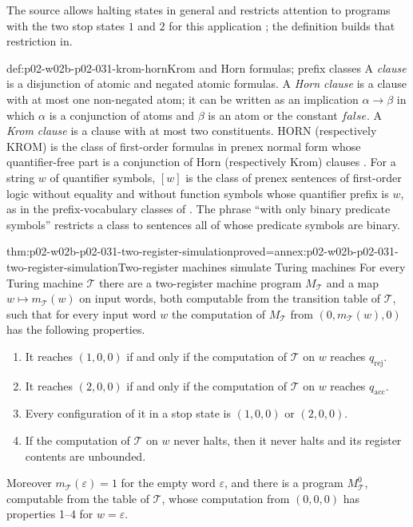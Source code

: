 The source allows halting states in general and restricts attention to
programs with the two stop states \(1\) and \(2\) for this application
\cite[Sect.~2.1.2, p.~34]{BorgerGradelGurevich1997}; the definition builds
that restriction in.

\begin{hbdefinition}{def:p02-w02b-p02-031-krom-horn}{Krom and Horn formulas; prefix classes}
A \emph{clause} is a disjunction of atomic and negated atomic formulas.  A
\emph{Horn clause} is a clause with at most one non-negated atom; it can be
written as an implication \(\alpha\to\beta\) in which \(\alpha\) is a
conjunction of atoms and \(\beta\) is an atom or the constant
\(\mathit{false}\).  A \emph{Krom clause} is a clause with at most two
constituents.  \(\mathrm{HORN}\) (respectively \(\mathrm{KROM}\)) is the
class of first-order formulas in prenex normal form whose quantifier-free part
is a conjunction of Horn (respectively Krom) clauses
\cite[Sect.~2.1.1, Def.~2.1.14, p.~27]{BorgerGradelGurevich1997}.  For a
string \(w\) of quantifier symbols, \([w]\) is the class of prenex sentences of
first-order logic without equality and without function symbols whose
quantifier prefix is \(w\), as in the prefix-vocabulary classes of
\cite[Sect.~1.3, Def.~1.3.1, p.~8]{BorgerGradelGurevich1997}.  The phrase
``with only binary predicate symbols'' restricts a class to sentences all of
whose predicate symbols are binary.
\end{hbdefinition}

\begin{hbtheorem}{thm:p02-w02b-p02-031-two-register-simulation}{proved=annex:p02-w02b-p02-031-two-register-simulation}{Two-register machines simulate Turing machines}
For every Turing machine \(\mathcal T\) there are a two-register machine
program \(M_{\mathcal T}\) and a map \(w\mapsto m_{\mathcal T}(w)\) on input
words, both computable from the transition table of \(\mathcal T\), such that
for every input word \(w\) the computation of \(M_{\mathcal T}\) from
\((0,m_{\mathcal T}(w),0)\) has the following properties.
\begin{enumerate}
\item It reaches \((1,0,0)\) if and only if the computation of \(\mathcal T\)
      on \(w\) reaches \(q_{\mathrm{rej}}\).
\item It reaches \((2,0,0)\) if and only if the computation of \(\mathcal T\)
      on \(w\) reaches \(q_{\mathrm{acc}}\).
\item Every configuration of it in a stop state is \((1,0,0)\) or \((2,0,0)\).
\item If the computation of \(\mathcal T\) on \(w\) never halts, then it never
      halts and its register contents are unbounded.
\end{enumerate}
Moreover \(m_{\mathcal T}(\varepsilon)=1\) for the empty word
\(\varepsilon\), and there is a program \(M^{0}_{\mathcal T}\), computable from
the table of \(\mathcal T\), whose computation from \((0,0,0)\) has
properties 1--4 for \(w=\varepsilon\).
\end{hbtheorem}

